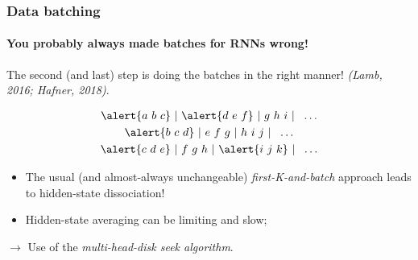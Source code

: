 \documentclass{beamer}
\begin{document}
{\begin{frame}
\end{frame}
\begin{frame}
	\frametitle{Data batching}
	\framesubtitle{You probably always made batches for RNNs wrong!}
	The second (and last) step is doing the batches in the right manner! \textit{(Lamb, 2016; Hafner, 2018)}.

\begin{gather*}
\alert{a\ b\ c}\ |\ \alert{d\ e\ f}\ |\ g\ h\ i\ |\ \ \dots \\
\alert{b\ c\ d}\ |\ e\ f\ g\ |\ h\ i\ j\ |\ \ \dots \\
\alert{c\ d\ e}\ |\ f\ g\ h\ |\ \alert{i\ j\ k}\ |\ \ \dots
\end{gather*}

\begin{itemize}
	\item{The usual (and almost-always unchangeable) \textit{first-K-and-batch} approach leads to hidden-state dissociation!}
	\item{Hidden-state averaging can be limiting and slow;}
\end{itemize}
\hfill\break
{$\rightarrow$ Use of the \textit{multi-head-disk seek algorithm}.}

\end{frame}
}
\end{document}
